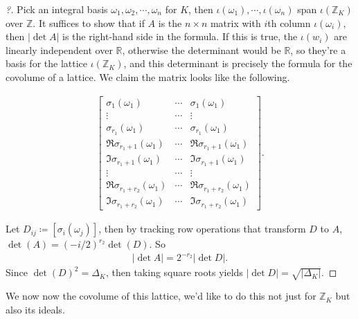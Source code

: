 \begin{proof}[?]

Pick an integral basis
\({ {\omega}_1, {\omega}_2, \cdots, {\omega}_{n}}\) for \(K\), then
\(\iota(\omega_1), \cdots, \iota(\omega_n)\) span
\(\iota({\mathbb{Z}}_K)\) over \({\mathbb{Z}}\). It suffices to show
that if \(A\) is the \(n\times n\) matrix with \(i\)th column
\(\iota(\omega_i)\), then \({\left\lvert {\det A} \right\rvert}\) is the
right-hand side in the formula. If this is true, the \(\iota(w_i)\) are
linearly independent over \({\mathbb{R}}\), otherwise the determinant
would be \({\mathbb{R}}\), so they're a basis for the lattice
\(\iota({\mathbb{Z}}_K)\), and this determinant is precisely the formula
for the covolume of a lattice. We claim the matrix looks like the
following.

\begin{align*}
\begin{bmatrix}
\sigma_1(\omega_1) & \cdots & \sigma_1(\omega_1) \\
\vdots & \cdots & \vdots \\
\sigma_{r_1}(\omega_1) & \cdots & \sigma_{r_1}(\omega_1) \\
\Re \sigma_{r_1+1}(\omega_1) & \cdots & \Re \sigma_{r_1+1}(\omega_1) \\
\Im \sigma_{r_1+1}(\omega_1) & \cdots & \Im \sigma_{r_1+1}(\omega_1) \\
\vdots & \cdots & \vdots \\
\Re \sigma_{r_1+r_2}(\omega_1) & \cdots & \Re \sigma_{r_1+r_2}(\omega_1) \\
\Im \sigma_{r_1+r_2}(\omega_1) & \cdots & \Im \sigma_{r_1+r_2}(\omega_1) 
\end{bmatrix}
.\end{align*}

Let \(D_{ij} \coloneqq{\left[ { \sigma_i(\omega_j) } \right]}\), then by
tracking row operations that transform \(D\) to \(A\),
\(\det(A) = (-i/2)^{r_2} \det(D)\). So
\begin{align*}
{\left\lvert {\det A} \right\rvert} = 2^{-r_2} {\left\lvert {\det D} \right\rvert}
.\end{align*}
Since \(\det(D)^2 = {\Delta}_K\), then taking square roots yields
\({\left\lvert {\det D} \right\rvert} = \sqrt{ {\left\lvert { {\Delta}_K} \right\rvert} }\).

\end{proof}

\begin{remark}

We now now the covolume of this lattice, we'd like to do this not just
for \({\mathbb{Z}}_K\) but also its ideals.

\end{remark}

